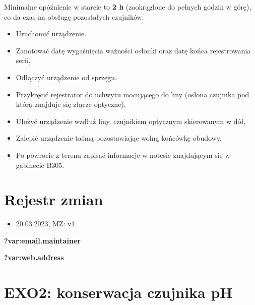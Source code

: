 \documentclass[
  letterpaper,
  DIV=11,
  numbers=noendperiod]{scrreprt}
\providecommand{\tightlist}{%
  \setlength{\itemsep}{0pt}\setlength{\parskip}{0pt}}\usepackage{longtable,booktabs,array}
\begin{document}
\begin{tcolorbox}[enhanced jigsaw, toptitle=1mm, bottomtitle=1mm, opacitybacktitle=0.6, colframe=quarto-callout-note-color-frame, bottomrule=.15mm, title=\textcolor{quarto-callout-note-color}{\faInfo}\hspace{0.5em}{Opóźniony start}, colbacktitle=quarto-callout-note-color!10!white, left=2mm, breakable, rightrule=.15mm, colback=white, opacityback=0, arc=.35mm, coltitle=black, leftrule=.75mm, toprule=.15mm, titlerule=0mm]

Minimalne opóźnienie w starcie to \textbf{2 h} (zaokrąglone do pełnych
godzin w górę), co da czas na obsługę pozostałych czujników.

\end{tcolorbox}

\begin{itemize}
\tightlist
\item
  Uruchomić urządzenie.
\item
  Zanotować datę wygaśnięcia ważności osłonki oraz datę końca
  rejestrowania serii,
\item
  Odłączyć urządzenie od sprzęgu.
\item
  Przykręcić rejestrator do uchwytu mocującego do liny (osłona czujnika
  pod którą znajduje się złącze optyczne),
\item
  Ułożyć urządzenie wzdłuż liny, czujnikiem optycznym skierowanym w dół,
\item
  Zalepić urządzenie taśmą pozostawiając wolną końcówkę obudowy,
\item
  Po powrocie z terenu zapisać informacje w notesie znajdującym się w
  gabinecie B305.
\end{itemize}

\newpage{}

\hypertarget{rejestr-zmian-1}{%
\chapter{Rejestr zmian}\label{rejestr-zmian-1}}

\begin{itemize}
\tightlist
\item
  20.03.2023, MZ: v1.
\end{itemize}

\textbf{?var:email.maintainer}

\textbf{?var:web.address}

\hypertarget{exo2-konserwacja-czujnika-ph}{%
\chapter{EXO2: konserwacja czujnika
pH}\label{exo2-konserwacja-czujnika-ph}}
\end{document}
